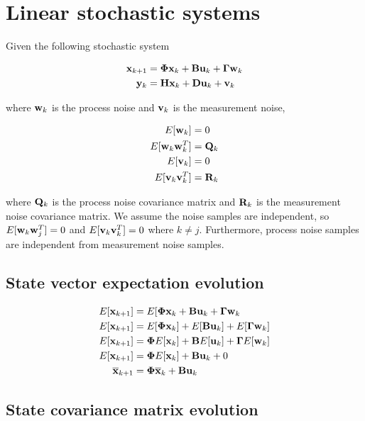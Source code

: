 \section{Linear stochastic systems}

Given the following stochastic system

\begin{align*}
  \mathbf{x}_{k+1} &= \mathbf{\Phi}\mathbf{x}_k + \mathbf{B}\mathbf{u}_k +
    \mathbf{\Gamma}\mathbf{w}_k \\
  \mathbf{y}_k &= \mathbf{H}\mathbf{x}_k + \mathbf{D}\mathbf{u}_k + \mathbf{v}_k
\end{align*}

where $\mathbf{w}_k$ is the process noise and $\mathbf{v}_k$ is the measurement noise,

\begin{align*}
  E[\mathbf{w}_k] &= 0 \\
  E[\mathbf{w}_k\mathbf{w}_k^T] &= \mathbf{Q}_k \\
  E[\mathbf{v}_k] &= 0 \\
  E[\mathbf{v}_k\mathbf{v}_k^T] &= \mathbf{R}_k
\end{align*}

where $\mathbf{Q}_k$ is the process noise covariance matrix and $\mathbf{R}_k$ is the
measurement noise covariance matrix. We assume the noise samples are
independent, so $E[\mathbf{w}_k\mathbf{w}_j^T] = 0$ and $E[\mathbf{v}_k\mathbf{v}_k^T] = 0$
where $k \neq j$. Furthermore, process noise samples are independent from
measurement noise samples.

\subsection{State vector expectation evolution}

\begin{align*}
  E[\mathbf{x}_{k+1}] &= E[\mathbf{\Phi}\mathbf{x}_k + \mathbf{B}\mathbf{u}_k +
    \mathbf{\Gamma}\mathbf{w}_k \\
  E[\mathbf{x}_{k+1}] &= E[\mathbf{\Phi}\mathbf{x}_k] + E[\mathbf{B}\mathbf{u}_k] +
    E[\mathbf{\Gamma}\mathbf{w}_k] \\
  E[\mathbf{x}_{k+1}] &= \mathbf{\Phi}E[\mathbf{x}_k] + \mathbf{B}E[\mathbf{u}_k] +
    \mathbf{\Gamma}E[\mathbf{w}_k] \\
  E[\mathbf{x}_{k+1}] &= \mathbf{\Phi}E[\mathbf{x}_k] + \mathbf{B}\mathbf{u}_k + 0 \\
  \overline{\mathbf{x}}_{k+1} &= \mathbf{\Phi}\overline{\mathbf{x}}_k +
    \mathbf{B}\mathbf{u}_k \\
\end{align*}

\subsection{State covariance matrix evolution}

